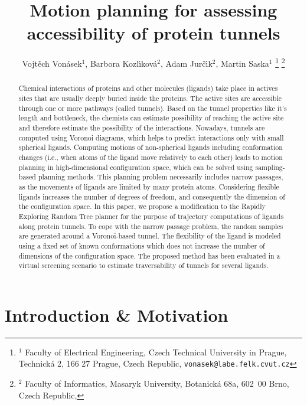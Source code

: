 \documentclass[usletter, 10pt, conference]{ieeeconf} %
\title{Motion planning for assessing accessibility of protein tunnels}
\author{Vojt\v ech Von\' asek$^{1}$,
    Barbora Kozl\'\i kov\'a$^{2}$,
    Adam Jur\v{c}\'\i k$^{2}$,
    Martin Saska$^{1}$
\thanks{$^{1}$ Faculty of Electrical Engineering,  Czech Technical University in Prague, 
Technick\'a 2, 166 27 Prague, Czech Republic,
{\tt vonasek@labe.felk.cvut.cz}}
\thanks{$^{2}$        
Faculty of Informatics,   Masaryk University, Botanick\'a 68a, 602~00 Brno, Czech Republic,
}
}
\begin{document}
\maketitle
\thispagestyle{empty}
\pagestyle{empty}

\begin{abstract}
Chemical interactions of proteins and other molecules (ligands) take place in actives sites that are usually deeply buried inside the proteins.
The active sites are accessible through one or more pathways (called tunnels).
Based on the tunnel properties like it's length and bottleneck, the chemists can estimate possibility of reaching the active site and therefore estimate the possibility of the interactions.
Nowadays, tunnels are computed using Voronoi diagrams, which helps to predict interactions only with small spherical ligands.
Computing motions of non-spherical ligands including conformation changes (i.e., when atoms of the ligand move relatively to each other) leads to motion planning in high-dimensional configuration space, which can be solved using sampling-based planning methods.
This planning problem necessarily includes narrow passages, as the movements of ligands are limited by many protein atoms.
Considering flexible ligands increases the number of degrees of freedom, and consequently the dimension of the configuration space.
In this paper, we propose a modification to the Rapidly Exploring Random Tree planner for the purpose of trajectory computations of ligands along protein tunnels.
To cope with the narrow passage problem, the random samples are generated around a Voronoi-based tunnel.
The flexibility of the ligand is modeled using a fixed set of known conformations which does not increase the number of dimensions of the configuration space.
The proposed method has been evaluated in a virtual screening scenario to estimate traversability of tunnels for several ligands.
\end{abstract}


\section{Introduction \& Motivation}
\end{document}
